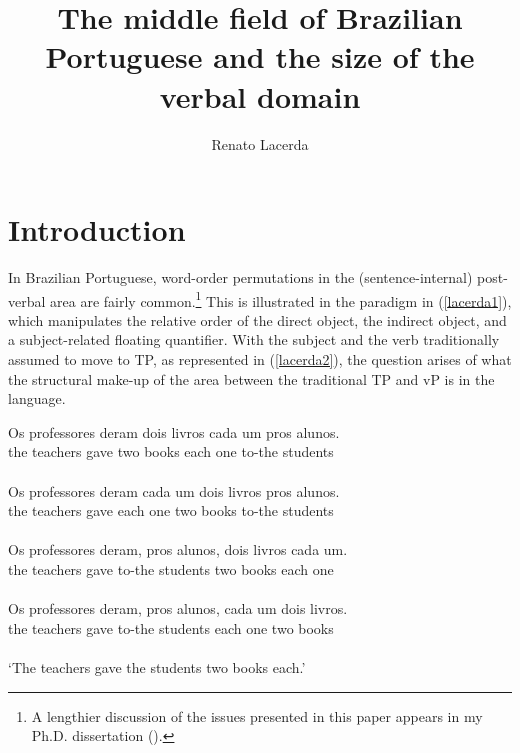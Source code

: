 \documentclass[output=paper]{langscibook}
\author{Renato Lacerda\affiliation{University of Connecticut}}
\title{The middle field of Brazilian Portuguese and the size of the verbal domain}
\begin{document}
\maketitle

\section{Introduction}
In Brazilian Portuguese, word-order permutations in the (sentence-internal) post-verbal area are fairly common.\footnote{A lengthier discussion of the issues presented in this paper appears in my Ph.D. dissertation (\citealt{Lacerda2020b}).}
This is illustrated in the paradigm in (\ref{lacerda1}), which manipulates the relative order of the direct object, the indirect object, and a subject-related floating quantifier. With the subject and the verb traditionally assumed to move to TP, as represented in (\ref{lacerda2}), the question arises of what the structural make-up of the area between the traditional TP and vP is in the language.

\begin{exe}
\ex \label{lacerda1}
\begin{xlist}
\ex \label{lacerda1a}
\gll Os professores deram dois livros cada um pros alunos.\\
the teachers gave two books each one to-the students\\\\

\ex \label{lacerda1b}
\gll Os professores deram cada um dois livros pros alunos.\\
the teachers gave each one two books to-the students\\\\

\ex \label{lacerda1c}
\gll Os professores deram, 	pros alunos, dois livros cada um.\\
the teachers gave to-the students two books each one\\\\

\ex \label{lacerda1d}
\gll Os	professores deram, 	pros alunos, cada um dois livros.\\
the teachers gave to-the students each one two books\\\\
`The teachers gave the students two books each.’	
\end{xlist}
\end{exe}
\end{document}

